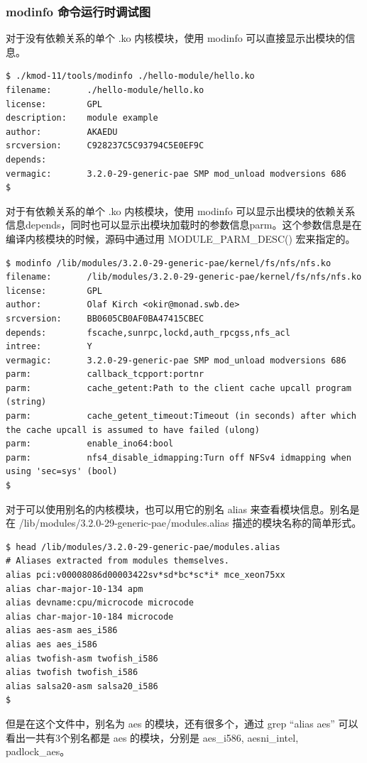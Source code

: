 \documentclass[11pt,a4paper]{article}
\begin{document}
\subsubsection{modinfo 命令运行时调试图}

对于没有依赖关系的单个 .ko 内核模块，使用 modinfo
可以直接显示出模块的信息。

{\begin{shaded}\begin{verbatim}
$ ./kmod-11/tools/modinfo ./hello-module/hello.ko 
filename:       ./hello-module/hello.ko
license:        GPL
description:    module example 
author:         AKAEDU
srcversion:     C928237C5C93794C5E0EF9C
depends:        
vermagic:       3.2.0-29-generic-pae SMP mod_unload modversions 686 
$ 
\end{verbatim}\end{shaded}}
对于有依赖关系的单个 .ko 内核模块，使用 modinfo
可以显示出模块的依赖关系信息depends，同时也可以显示出模块加载时的参数信息parm。这个参数信息是在编译内核模块的时候，源码中通过用
MODULE\_PARM\_DESC() 宏来指定的。

{\begin{shaded}\begin{verbatim}
$ modinfo /lib/modules/3.2.0-29-generic-pae/kernel/fs/nfs/nfs.ko 
filename:       /lib/modules/3.2.0-29-generic-pae/kernel/fs/nfs/nfs.ko
license:        GPL
author:         Olaf Kirch <okir@monad.swb.de>
srcversion:     BB0605CB0AF0BA47415CBEC
depends:        fscache,sunrpc,lockd,auth_rpcgss,nfs_acl
intree:         Y
vermagic:       3.2.0-29-generic-pae SMP mod_unload modversions 686 
parm:           callback_tcpport:portnr
parm:           cache_getent:Path to the client cache upcall program (string)
parm:           cache_getent_timeout:Timeout (in seconds) after which the cache upcall is assumed to have failed (ulong)
parm:           enable_ino64:bool
parm:           nfs4_disable_idmapping:Turn off NFSv4 idmapping when using 'sec=sys' (bool)
$ 
\end{verbatim}\end{shaded}}
对于可以使用别名的内核模块，也可以用它的别名 alias
来查看模块信息。别名是在 /lib/modules/3.2.0-29-generic-pae/modules.alias
描述的模块名称的简单形式。

{\begin{shaded}\begin{verbatim}
$ head /lib/modules/3.2.0-29-generic-pae/modules.alias
# Aliases extracted from modules themselves.
alias pci:v00008086d00003422sv*sd*bc*sc*i* mce_xeon75xx
alias char-major-10-134 apm
alias devname:cpu/microcode microcode
alias char-major-10-184 microcode
alias aes-asm aes_i586
alias aes aes_i586
alias twofish-asm twofish_i586
alias twofish twofish_i586
alias salsa20-asm salsa20_i586
$ 
\end{verbatim}\end{shaded}}
但是在这个文件中，别名为 aes 的模块，还有很多个，通过 grep ``alias aes''
可以看出一共有3个别名都是 aes 的模块，分别是 aes\_i586, aesni\_intel,
padlock\_aes。
\end{document}
